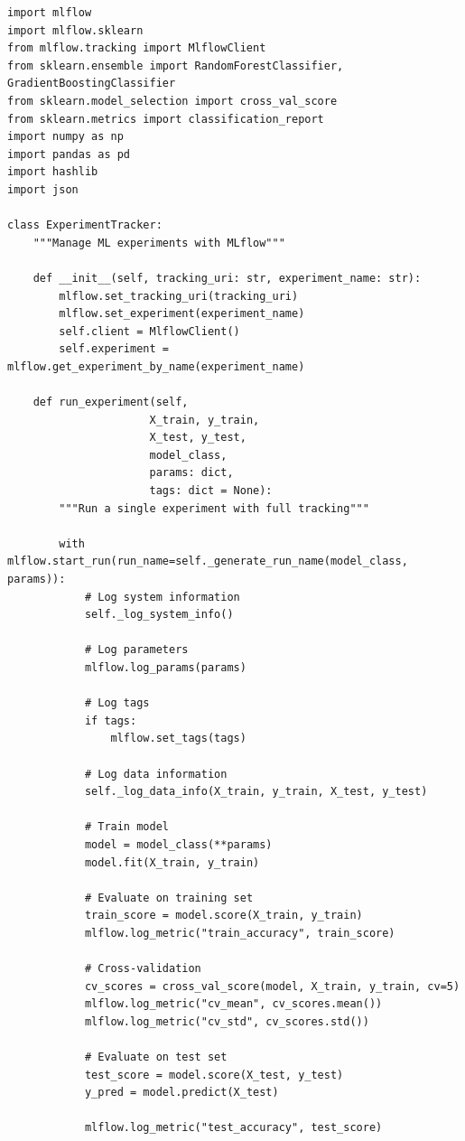 \begin{lstlisting}[style=python, caption=Comprehensive MLflow experiment tracking]
import mlflow
import mlflow.sklearn
from mlflow.tracking import MlflowClient
from sklearn.ensemble import RandomForestClassifier, GradientBoostingClassifier
from sklearn.model_selection import cross_val_score
from sklearn.metrics import classification_report
import numpy as np
import pandas as pd
import hashlib
import json

class ExperimentTracker:
    """Manage ML experiments with MLflow"""

    def __init__(self, tracking_uri: str, experiment_name: str):
        mlflow.set_tracking_uri(tracking_uri)
        mlflow.set_experiment(experiment_name)
        self.client = MlflowClient()
        self.experiment = mlflow.get_experiment_by_name(experiment_name)

    def run_experiment(self,
                      X_train, y_train,
                      X_test, y_test,
                      model_class,
                      params: dict,
                      tags: dict = None):
        """Run a single experiment with full tracking"""

        with mlflow.start_run(run_name=self._generate_run_name(model_class, params)):
            # Log system information
            self._log_system_info()

            # Log parameters
            mlflow.log_params(params)

            # Log tags
            if tags:
                mlflow.set_tags(tags)

            # Log data information
            self._log_data_info(X_train, y_train, X_test, y_test)

            # Train model
            model = model_class(**params)
            model.fit(X_train, y_train)

            # Evaluate on training set
            train_score = model.score(X_train, y_train)
            mlflow.log_metric("train_accuracy", train_score)

            # Cross-validation
            cv_scores = cross_val_score(model, X_train, y_train, cv=5)
            mlflow.log_metric("cv_mean", cv_scores.mean())
            mlflow.log_metric("cv_std", cv_scores.std())

            # Evaluate on test set
            test_score = model.score(X_test, y_test)
            y_pred = model.predict(X_test)

            mlflow.log_metric("test_accuracy", test_score)


\end{lstlisting}

